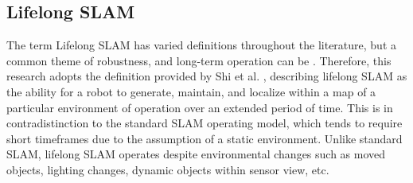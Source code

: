 \subsection{Lifelong SLAM}

The term Lifelong SLAM has varied definitions throughout the literature, but a common theme of robustness, and long-term operation can be . Therefore, this research adopts the definition provided by Shi et al. \cite{shiAreWeReady2020}, describing lifelong SLAM as the ability for a robot to generate, maintain, and localize within a map of a particular environment of operation over an extended period of time. This is in contradistinction to the standard SLAM operating model, which tends to require short timeframes due to the assumption of a static environment. Unlike standard SLAM, lifelong SLAM operates despite environmental changes such as moved objects, lighting changes, dynamic objects within sensor view, etc. 